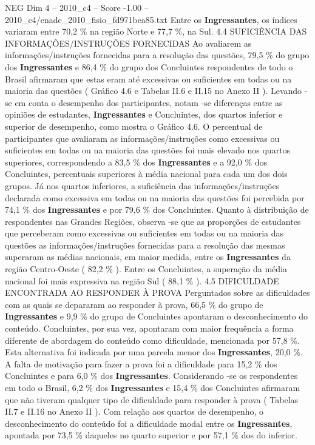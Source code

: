 \begin{textsample}{NEG Dim 4 – 2010\_c4 – Score -1.00 – 2010\_c4/enade\_2010\_fisio\_fd971bea85.txt}
Entre os \textbf{Ingressantes}, os índices variaram entre 70,2 \% na região Norte e 77,7 \%, na Sul. 4.4 SUFICIÊNCIA DAS INFORMAÇÕES/INSTRUÇÕES FORNECIDAS Ao avaliarem as informações/instruções fornecidas para a resolução das questões, 79,5 \% do grupo dos \textbf{Ingressantes} e 86,4 \% do grupo dos Concluintes respondentes de todo o Brasil afirmaram que estas eram até excessivas ou suficientes em todas ou na maioria das questões ( Gráfico 4.6 e Tabelas II.6 e II.15 no Anexo II ).
Levando -se em conta o desempenho dos participantes, notam -se diferenças entre as opiniões de estudantes, \textbf{Ingressantes} e Concluintes, dos quartos inferior e superior de desempenho, como mostra o Gráfico 4.6.
O percentual de participantes que avaliaram as informações/instruções como excessivas ou suficientes em todas ou na maioria das questões foi mais elevado nos quartos superiores, correspondendo a 83,5 \% dos \textbf{Ingressantes} e a 92,0 \% dos Concluintes, percentuais superiores à média nacional para cada um dos dois grupos.
Já nos quartos inferiores, a suficiência das informações/instruções declarada como excessiva em todas ou na maioria das questões foi percebida por 74,1 \% dos \textbf{Ingressantes} e por 79,6 \% dos Concluintes.
Quanto à distribuição de respondentes nas Grandes Regiões, observa -se que as proporções de estudantes que perceberam como excessivas ou suficientes em todas ou na maioria das questões as informações/instruções fornecidas para a resolução das mesmas superaram as médias nacionais, em maior medida, entre os \textbf{Ingressantes} da região Centro-Oeste ( 82,2 \% ).
Entre os Concluintes, a superação da média nacional foi mais expressiva na região Sul ( 88,1 \% ). 4.5 DIFICULDADE ENCONTRADA AO RESPONDER À PROVA Perguntados sobre as dificuldades com as quais se depararam ao responder à prova, 66,5 \% do grupo de \textbf{Ingressantes} e 9,9 \% do grupo de Concluintes apontaram o desconhecimento do conteúdo.
Concluintes, por sua vez, apontaram com maior frequência a forma diferente de abordagem do conteúdo como dificuldade, mencionada por 57,8 \%.
Esta alternativa foi indicada por uma parcela menor dos \textbf{Ingressantes}, 20,0 \%.
A falta de motivação para fazer a prova foi a dificuldade para 15,2 \% dos Concluintes e para 6,0 \% dos \textbf{Ingressantes}.
Considerando -se os respondentes em todo o Brasil, 6,2 \% dos \textbf{Ingressantes} e 15,4 \% dos Concluintes afirmaram que não tiveram qualquer tipo de dificuldade para responder à prova ( Tabelas II.7 e II.16 no Anexo II ).
Com relação aos quartos de desempenho, o desconhecimento do conteúdo foi a dificuldade modal entre os \textbf{Ingressantes}, apontada por 73,5 \% daqueles no quarto superior e por 57,1 \% dos do inferior.

\end{textsample}
